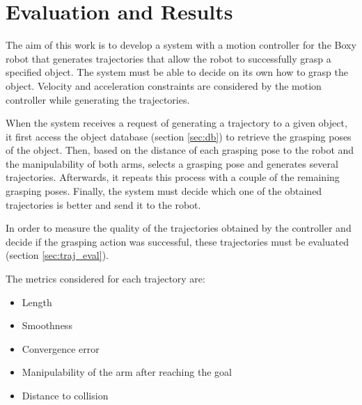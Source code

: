 

\chapter{\textbf{Evaluation and Results}}

The aim of this work is to develop a system with a motion controller for the Boxy robot that generates trajectories that allow the robot to successfully grasp a specified object. The system must be able to decide on its own how to grasp the object. Velocity and acceleration constraints are considered by the motion controller while generating the trajectories. 

When the system receives a request of generating a trajectory to a given object, it first access the object database (section \ref{sec:db}) to retrieve the grasping poses of the object. Then, based on the distance of each grasping pose to the robot and the manipulability of both arms, selects a grasping pose and generates several trajectories. Afterwards, it repeats this process with a couple of the remaining grasping poses. Finally, the system must decide which one of the obtained trajectories is better and send it to the robot.

In order to measure the quality of the trajectories obtained by the controller and decide if the grasping action was successful, these trajectories must be evaluated (section \ref{sec:traj_eval}).

The metrics considered for each trajectory are:
\begin{itemize}
	\item Length
	\item Smoothness
	\item Convergence error
	\item Manipulability of the arm after reaching the goal
	\item Distance to collision
\end{itemize}


